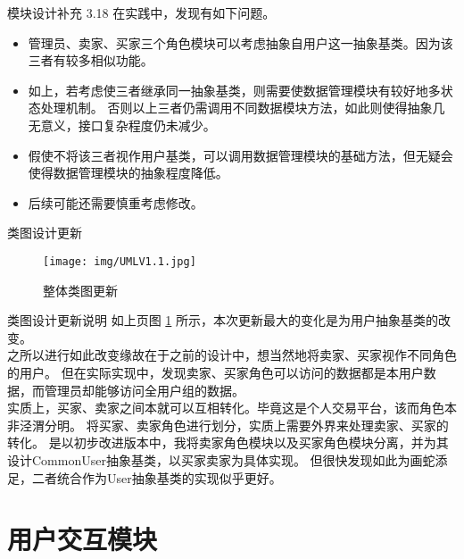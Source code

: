 \documentclass[10pt]{beamer}
\begin{document}
\begin{frame}{模块设计补充 3.18}
    在实践中，发现有如下问题。\\
    \begin{itemize}
        \item 管理员、卖家、买家三个角色模块可以考虑抽象自用户这一抽象基类。因为该三者有较多相似功能。
        \item 如上，若考虑使三者继承同一抽象基类，则需要使数据管理模块有较好地多状态处理机制。
              否则以上三者仍需调用不同数据模块方法，如此则使得抽象几无意义，接口复杂程度仍未减少。
        \item 假使不将该三者视作用户基类，可以调用数据管理模块的基础方法，但无疑会使得数据管理模块的抽象程度降低。
        \item 后续可能还需要慎重考虑修改。
    \end{itemize}
\end{frame}

\begin{frame}{类图设计更新}
    \begin{figure}[H]
        \centering
        \texttt{[image: img/UMLV1.1.jpg]}
        \caption{整体类图更新}
        \label{UmlClassv1.1}
    \end{figure}
\end{frame}

\begin{frame}{类图设计更新说明}
    如上页图 \ref{UmlClassv1.1} 所示，本次更新最大的变化是为用户抽象基类的改变。\\
    之所以进行如此改变缘故在于之前的设计中，想当然地将卖家、买家视作不同角色的用户。
    但在实际实现中，发现卖家、买家角色可以访问的数据都是本用户数据，而管理员却能够访问全用户组的数据。\\
    实质上，买家、卖家之间本就可以互相转化。毕竟这是个人交易平台，该而角色本非泾渭分明。
    将买家、卖家角色进行划分，实质上需要外界来处理卖家、买家的转化。
    是以初步改进版本中，我将卖家角色模块以及买家角色模块分离，并为其设计CommonUser抽象基类，以买家卖家为具体实现。
    但很快发现如此为画蛇添足，二者统合作为User抽象基类的实现似乎更好。
\end{frame}

\section{用户交互模块}
\end{document}
